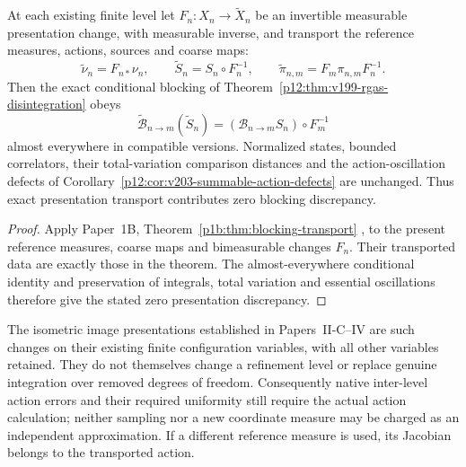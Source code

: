 \documentclass[12pt,a4paper]{article}
\begin{document}
\begin{theorem}
\label{p12:thm:v204-blocking-presentation}
At each existing finite level let $F_n:X_n\to\widetilde X_n$ be an
invertible measurable presentation change, with measurable inverse, and
transport the reference measures, actions, sources and coarse maps:
\[
 \widetilde\nu_n=F_{n*}\nu_n,\qquad
 \widetilde S_n=S_n\circ F_n^{-1},\qquad
 \widetilde\pi_{n,m}=F_m\pi_{n,m}F_n^{-1}.
\]
Then the exact conditional blocking of
Theorem~\ref{p12:thm:v199-rgas-disintegration} obeys
\[
 \widetilde{\mathcal B}_{n\to m}(\widetilde S_n)
   =(\mathcal B_{n\to m}S_n)\circ F_m^{-1}
\]
almost everywhere in compatible versions. Normalized states, bounded
correlators, their total-variation comparison distances and the
action-oscillation defects of
Corollary~\ref{p12:cor:v203-summable-action-defects} are unchanged.
Thus exact presentation transport contributes zero blocking discrepancy.
\end{theorem}
\begin{proof}
Apply Paper~1B, Theorem~\ref{p1b:thm:blocking-transport}
\cite{Kugelmann2026Paper1B}, to the present reference measures, coarse
maps and bimeasurable changes $F_n$. Their transported data are exactly
those in the theorem. The almost-everywhere conditional identity and
preservation of integrals, total variation and essential oscillations
therefore give the stated zero presentation discrepancy.
\end{proof}
The isometric image presentations established in Papers~II-C--IV are such
changes on their existing finite configuration variables, with all other
variables retained. They do not themselves change a refinement level or
replace genuine integration over removed degrees of freedom. Consequently
native inter-level action errors and their required uniformity still require
the actual action calculation; neither sampling nor a new coordinate measure
may be charged as an independent approximation. If a different reference
measure is used, its Jacobian belongs to the transported action.

\end{document}

